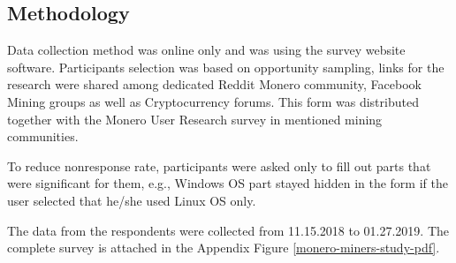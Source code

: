 \documentclass[
  printed, %
  table,   %
  lof,     %
  lot,     %
           oneside, color
]{fithesis3}
\begin{document}
\subsection{Methodology}
Data collection method was online only and was using the survey website software. Participants selection was based on opportunity sampling, links for the research were shared among dedicated Reddit Monero community, Facebook Mining groups as well as Cryptocurrency forums. This form was distributed together with the Monero User Research survey in mentioned mining communities.

To reduce nonresponse rate, participants were asked only to fill out parts that were significant for them, e.g., Windows OS part stayed hidden in the form if the user selected that he/she used Linux OS only. 

The data from the respondents were collected from 11.15.2018 to 01.27.2019. The complete survey is attached in the Appendix Figure \ref{monero-miners-study-pdf}.
\end{document}
